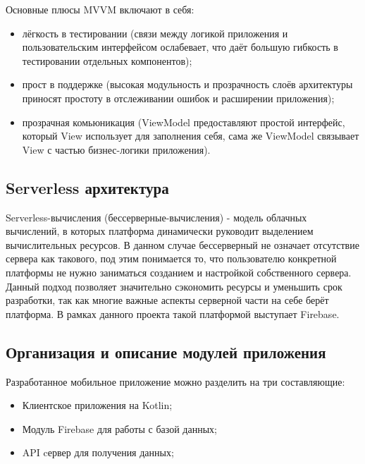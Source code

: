  Основные плюсы MVVM включают в себя:

\begin{itemize}
  \item лёгкость в тестировании (связи между логикой приложения и пользовательским интерфейсом ослабевает, что даёт большую гибкость в тестировании отдельных компонентов);
  \item прост в поддержке (высокая модульность и прозрачность слоёв архитектуры приносят простоту в отслеживании ошибок и расширении приложения);
  \item прозрачная комьюникация (ViewModel предоставляют простой интерфейс, который View использует для заполнения себя, сама же ViewModel связывает View с частью бизнес-логики приложения).
\end{itemize}
 
\subsection{Serverless архитектура}
Serverless-вычисления (бессерверные-вычисления) - модель облачных вычислений, в которых платформа динамически руководит выделением вычислительных ресурсов. 
В данном случае бессерверный не означает отсутствие сервера как такового, под этим понимается то, что пользователю конкретной платформы не нужно заниматься созданием и настройкой собственного сервера. 
Данный подход позволяет значительно сэкономить ресурсы и уменьшить срок разработки, так как многие важные аспекты серверной части на себе берёт платформа. 
В рамках данного проекта такой платформой выступает Firebase.
 
\subsection{Организация и описание модулей приложения}
Разработанное мобильное приложение можно разделить на три составляющие:
\begin{itemize}
 \item Клиентское приложения на Kotlin;
 \item Модуль Firebase для работы с базой данных;
 \item API cервер для получения данных;
\end{itemize}
 
